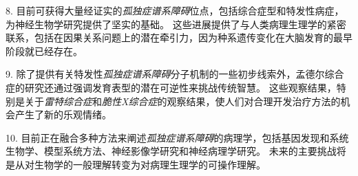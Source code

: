 8. 目前可获得大量经证实的\textit{孤独症谱系障碍}位点，包括综合症型和特发性病症，为神经生物学研究提供了坚实的基础。
这些进展提供了与人类病理生理学的紧密联系，包括在因果关系问题上的潜在牵引力，因为种系遗传变化在大脑发育的最早阶段就已经存在。


9. 除了提供有关特发性\textit{孤独症谱系障碍}分子机制的一些初步线索外，孟德尔综合症的研究还通过强调发育表型的潜在可逆性来挑战传统智慧。
这些观察结果，特别是关于\textit{雷特综合症}和\textit{脆性X综合症}的观察结果，使人们对合理开发治疗方法的机会产生了新的乐观情绪。


10. 目前正在融合多种方法来阐述\textit{孤独症谱系障碍}的病理学，包括基因发现和系统生物学、模型系统方法、神经影像学研究和神经病理学研究。
未来的主要挑战将是从对生物学的一般理解转变为对病理生理学的可操作理解。

